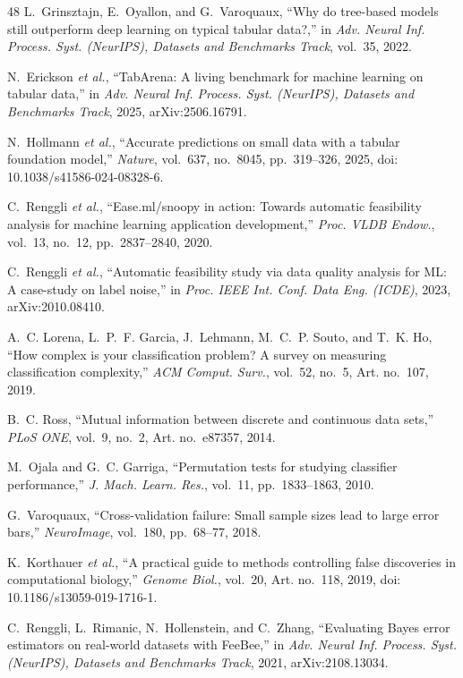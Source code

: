 \begin{thebibliography}{48}
L.~Grinsztajn, E.~Oyallon, and G.~Varoquaux, ``Why do tree-based models still outperform deep learning on typical tabular data?,'' in \emph{Adv. Neural Inf. Process. Syst. (NeurIPS), Datasets and Benchmarks Track}, vol.~35, 2022.

N.~Erickson \emph{et al.}, ``TabArena: A living benchmark for machine learning on tabular data,'' in \emph{Adv. Neural Inf. Process. Syst. (NeurIPS), Datasets and Benchmarks Track}, 2025, arXiv:2506.16791.

N.~Hollmann \emph{et al.}, ``Accurate predictions on small data with a tabular foundation model,'' \emph{Nature}, vol.~637, no.~8045, pp.~319--326, 2025, doi: 10.1038/s41586-024-08328-6.

C.~Renggli \emph{et al.}, ``Ease.ml/snoopy in action: Towards automatic feasibility analysis for machine learning application development,'' \emph{Proc. VLDB Endow.}, vol.~13, no.~12, pp.~2837--2840, 2020.

C.~Renggli \emph{et al.}, ``Automatic feasibility study via data quality analysis for ML: A case-study on label noise,'' in \emph{Proc. IEEE Int. Conf. Data Eng. (ICDE)}, 2023, arXiv:2010.08410.

A.~C. Lorena, L.~P.~F. Garcia, J.~Lehmann, M.~C.~P. Souto, and T.~K. Ho, ``How complex is your classification problem? A survey on measuring classification complexity,'' \emph{ACM Comput. Surv.}, vol.~52, no.~5, Art. no.~107, 2019.

B.~C. Ross, ``Mutual information between discrete and continuous data sets,'' \emph{PLoS ONE}, vol.~9, no.~2, Art. no.~e87357, 2014.

M.~Ojala and G.~C. Garriga, ``Permutation tests for studying classifier performance,'' \emph{J. Mach. Learn. Res.}, vol.~11, pp.~1833--1863, 2010.

G.~Varoquaux, ``Cross-validation failure: Small sample sizes lead to large error bars,'' \emph{NeuroImage}, vol.~180, pp.~68--77, 2018.

K.~Korthauer \emph{et al.}, ``A practical guide to methods controlling false discoveries in computational biology,'' \emph{Genome Biol.}, vol.~20, Art. no.~118, 2019, doi: 10.1186/s13059-019-1716-1.

C.~Renggli, L.~Rimanic, N.~Hollenstein, and C.~Zhang, ``Evaluating Bayes error estimators on real-world datasets with FeeBee,'' in \emph{Adv. Neural Inf. Process. Syst. (NeurIPS), Datasets and Benchmarks Track}, 2021, arXiv:2108.13034.


\end{thebibliography}
